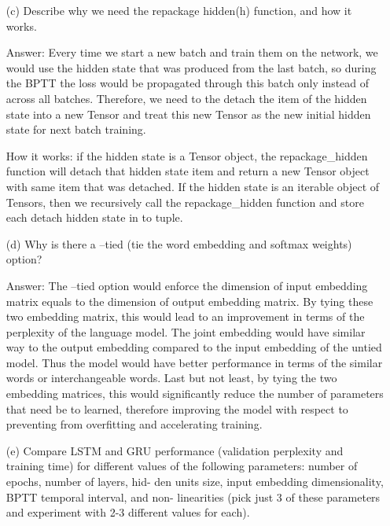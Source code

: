 \documentclass[12pt,letterpaper]{article}
\begin{document}
\begin{itemize}
    \item[(c)]Describe why we need the repackage hidden(h) function, and how it works.
    
    Answer: Every time we start a new batch and train them on the network, we would use the hidden state that was produced from the last batch, so during the BPTT the loss would be propagated through this batch only instead of across all batches. Therefore, we need to the detach the item of the hidden state into a new Tensor and treat this new Tensor as the new initial hidden state for next batch training.
    
    How it works: if the hidden state is a Tensor object, the repackage\_hidden function will detach that hidden state item and return a new Tensor object with same item that was detached. If the hidden state is an iterable object of Tensors, then we recursively call the repackage\_hidden function and store each detach hidden state in to tuple.
    
    \item[(d)]Why is there a --tied (tie the word embedding and softmax weights) option?
    
    Answer: The --tied option would enforce the dimension of input embedding matrix equals to the dimension of output embedding matrix. By tying these two embedding matrix, this would lead to an improvement in terms of the perplexity of the language model. The joint embedding would have similar way to the output embedding compared to the input embedding of the untied model. Thus the model would have better performance in terms of the similar words or interchangeable words. Last but not least, by tying the two embedding matrices, this would significantly reduce the number of parameters that need be to learned, therefore improving the model with respect to preventing from overfitting and accelerating training.
    
    \item[(e)]Compare LSTM and GRU performance (validation perplexity and training time) for different values of the following parameters: number of epochs, number of layers, hid- den units size, input embedding dimensionality, BPTT temporal interval, and non- linearities (pick just 3 of these parameters and experiment with 2-3 different values for each).
    

\end{itemize}
\end{document}
